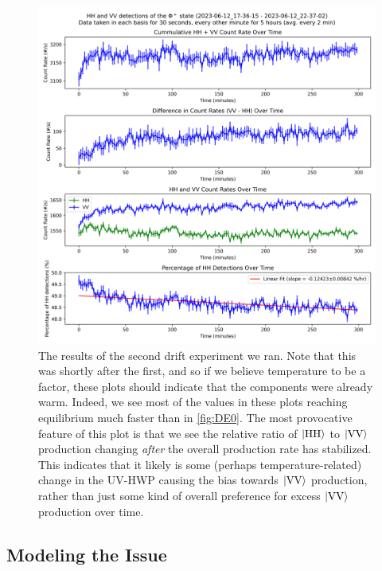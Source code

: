 \begin{figure}
	\centering
	\includegraphics[width=\textwidth]{DE1_plot.png}
	\caption{The results of the second drift experiment we ran. Note that this was shortly after the first, and so if we believe temperature to be a factor, these plots should indicate that the components were already warm. Indeed, we see most of the values in these plots reaching equilibrium much faster than in \cref{fig:DE0}. The most provocative feature of this plot is that we see the relative ratio of $\ket{\text{HH}}$ to $\ket{\text{VV}}$ production changing \textit{after} the overall production rate has stabilized. This indicates that it likely is some (perhaps temperature-related) change in the UV-HWP causing the bias towards $\ket{\text{VV}}$ production, rather than just some kind of overall preference for excess $\ket{\text{VV}}$ production over time.}
	\label{fig:DE1}
\end{figure}


\subsection{Modeling the Issue}

